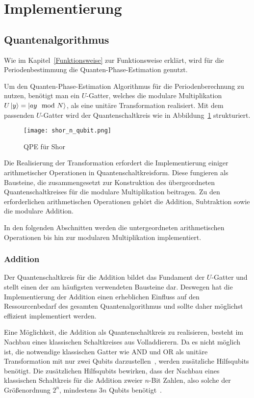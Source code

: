 \section{Implementierung}

\subsection{Quantenalgorithmus}
Wie im Kapitel~\ref{Funktionsweise} zur Funktionsweise erklärt,
wird für die Periodenbestimmung die Quanten-Phase-Estimation genutzt.

Um den Quanten-Phase-Estimation Algorithmus für die Periodenberechnung zu nutzen,
benötigt man ein \(U\)-Gatter, 
welches die modulare Multiplikation \(U\ket{y} = \ket{ay \mod N}\), 
als eine unitäre Transformation realisiert.
Mit dem passenden \(U\)-Gatter wird der Quantenschaltkreis wie in Abbildung~\ref{fig:shor_n_qubit} strukturiert.
\begin{figure}
    \caption{QPE für Shor~\cite{anonymousket}}
    \label{fig:shor_n_qubit}
    \texttt{[image: shor\_n\_qubit.png]}
    \centering
    \end{figure}

Die Realisierung der Transformation erfordert die Implementierung einiger arithmetischer Operationen in Quantenschaltkreisform. 
Diese fungieren als Bausteine, die zusammengesetzt zur Konstruktion des übergeordneten Quantenschaltkreises für die modulare Multiplikation beitragen. 
Zu den erforderlichen arithmetischen Operationen gehört die Addition, Subtraktion sowie die modulare Addition.

In den folgenden Abschnitten werden die untergeordneten arithmetischen Operationen bis hin zur modularen Multiplikation implementiert.

\subsubsection{Addition}
Der Quantenschaltkreis für die Addition bildet das Fundament der \(U\)-Gatter und 
stellt einen der am häufigsten verwendeten Bausteine dar. 
Deswegen hat die Implementierung der Addition einen erheblichen Einfluss auf den Ressourcenbedarf des gesamten Quantenalgorithmus
und sollte daher möglichst effizient implementiert werden.

Eine Möglichkeit, die Addition als Quantenschaltkreis zu realisieren, 
besteht im Nachbau eines klassischen Schaltkreises aus Volladdierern. 
Da es nicht möglich ist, 
die notwendige klassischen Gatter wie AND und OR als unitäre Transformation mit nur zwei Qubits darzustellen~\cite{Hoever2023QC},
werden zusätzliche Hilfsqubits benötigt.
Die zusätzlichen Hilfsqubits bewirken, dass der Nachbau eines klassischen Schaltkreis für die Addition zweier \(n\)-Bit Zahlen, 
also solche der Größenordnung \(2^n\), mindestens \(3n\) Qubits benötigt~\cite{zalka1998fast}.

